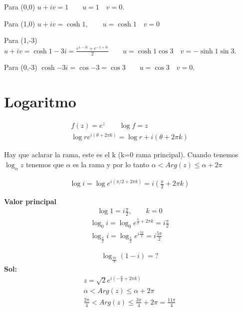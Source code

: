\documentclass{article}
\newcommand{\caja}[3]{%
  \begin{tcolorbox}[colback=#1!5!white,colframe=#1!25!black,title=#2]
    #3
  \end{tcolorbox}%
}
\begin{document}
Para (0,0) $u + i v = 1 \qquad u = 1\quad v = 0  $. 

Para (1,0) $ u + i v = \cosh{1 }, \qquad u = \cosh{1 } \quad v = 0 $

Para (1,-3) $ u + iv = \cosh{1 - 3i } = \frac{e ^ {1 - 3i } + e ^ {-1+3i }}{2}\qquad u = \cosh{1 }\cos{3 } \quad v = -\sinh{1 }\sin{3 } $.

Para (0,-3) $ \cosh{-3i } = \cos{-3 } = \cos{3 }\qquad u = \cos{3 }\quad v = 0  $.

\section{Logaritmo }
\begin{gather*}
  f(z) = e ^ {z }\qquad \log{f} = z \\
  \log{r e ^ {i (\theta + 2\pi k )}} = \log{r} + i (\theta + 2 \pi k)
\end{gather*}

Hay que aclarar la rama, este es el k (k=0 rama principal). Cuando tenemos $ \log_\alpha{z} $ tenemos que $ \alpha $ es la rama y por lo tanto $ \alpha<Arg(z)\leq \alpha + 2 \pi $

\begin{gather*}
  \log{i} = \log{e ^ {i(\pi/2 + 2 \pi k )}} = i (\frac{\pi}{2} + 2 \pi k) 
\end{gather*}

\textbf{Valor principal }
\begin{gather*}
  \log{1} = i \frac{\pi}{2} , \qquad k = 0 
\end{gather*}
\begin{gather*}
  \log_0 {i} = \log_0 {e ^ {\frac{\pi }{2} + 2\pi k }}  = i \frac{\pi}{2}\\
  \log_\frac{\pi}{2}{i } = \log_\frac{\pi}{2}{e ^ {i \frac{5 \pi}{2}}} = i \frac{5\pi}{2}
\end{gather*}

\caja{blue}{Ejercicio }{
  \begin{gather*}
    \log_ \frac{3\pi}{4} (1-i ) = ? 
  \end{gather*}
  \textbf{Sol: }
  \begin{gather*}
    z = \sqrt{2 } e ^ {i (-\frac{\pi}{4} + 2 \pi k )}\\
    \alpha<Arg(z)\leq \alpha + 2\pi\\
    \frac{2\pi}{4} < Arg(z ) \leq \frac{3\pi}{4} + 2 \pi = \frac{11\pi}{4}
  \end{gather*}
}
\end{document}
